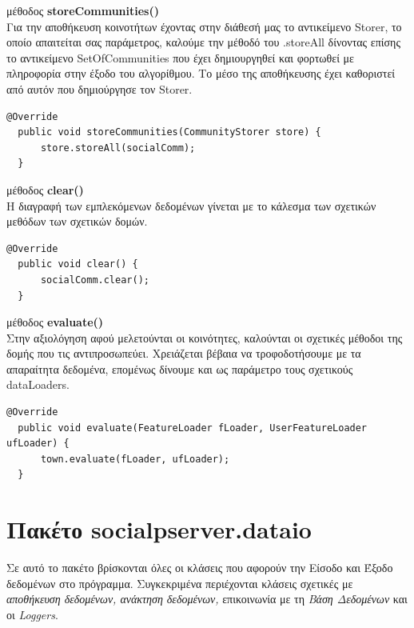 \begin{description}
\item μέθοδος \textbf{storeCommunities()}   \hfill \\
Για την αποθήκευση κοινοτήτων έχοντας στην διάθεσή μας το αντικείμενο Storer, το οποίο απαιτείται σας παράμετρος, καλούμε την μέθοδό του .storeAll δίνοντας 
επίσης το αντικείμενο SetOfCommunities που έχει δημιουργηθεί και φορτωθεί με πληροφορία στην έξοδο του αλγορίθμου. Το μέσο της αποθήκευσης έχει καθοριστεί από αυτόν που δημιούργησε
τον Storer.
\begin{lstlisting}[frame=single]
  @Override
  public void storeCommunities(CommunityStorer store) {
      store.storeAll(socialComm);
  }
\end{lstlisting}
\item μέθοδος \textbf{clear()}\hfill \\
Η διαγραφή των εμπλεκόμενων δεδομένων γίνεται με το κάλεσμα των σχετικών μεθόδων των σχετικών δομών.
\begin{lstlisting}[frame=single]
  @Override
  public void clear() {
      socialComm.clear();
  }
\end{lstlisting}  
\item μέθοδος \textbf{evaluate()}\hfill \\
Στην αξιολόγηση αφού μελετούνται οι κοινότητες, καλούνται οι σχετικές μέθοδοι της δομής που τις αντιπροσωπεύει. 
Χρειάζεται βέβαια να τροφοδοτήσουμε με τα απαραίτητα δεδομένα, επομένως δίνουμε και ως παράμετρο τους σχετικούς dataLoaders.
\begin{lstlisting}[frame=single]
  @Override
  public void evaluate(FeatureLoader fLoader, UserFeatureLoader ufLoader) {
      town.evaluate(fLoader, ufLoader);
  }
\end{lstlisting}    
\end{description}  

\clearpage %

\section{Πακέτο socialpserver.dataio}
\label{socialpserver.dataio}
\noindent
Σε αυτό το πακέτο βρίσκονται όλες οι κλάσεις που αφορούν την Είσοδο και Έξοδο δεδομένων στο πρόγραμμα. Συγκεκριμένα περιέχονται κλάσεις σχετικές με 
\emph{αποθήκευση δεδομένων, ανάκτηση δεδομένων,} επικοινωνία με τη \emph{Βάση Δεδομένων} και οι \emph{Loggers}.  

\vfill

